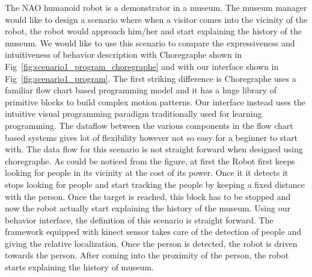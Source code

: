 \documentclass{llncs}
\begin{document}
The NAO humanoid robot is a demonstrator in a museum. The museum manager would like to design a scenario where when a visitor comes into the vicinity of the robot, the robot would approach him/her and start explaining the history of the museum. We would like to use this scenario to compare the expressiveness and intuitiveness of behavior description with Choregraphe \cite{Choregraphe} shown in Fig~\ref{fig:scenario1_program_choregraphe} and with our interface shown in Fig~\ref{fig:scenario1_program}. The first striking difference is Choregraphe uses a familiar flow chart based programming model and it has a huge library of primitive blocks to build complex motion patterns. Our interface instead uses the intuitive visual programming paradigm traditionally used for learning programming. The dataflow between the various components in the flow chart based systems gives lot of flexibility however not so easy for a beginner to start with. 
	The data flow for this scenario is not straight forward when designed using choregraphe. As could be noticed from the figure, at first the Robot first keeps looking for people in its vicinity at the cost of its power. Once it it detects it stops looking for people and start tracking the people by keeping a fixed distance with the person. Once the target is reached, this block has to be stopped and now the robot actually start explaining the history of the museum.
	Using our behavior interface, the definition of this scenario is straight forward. The framework equipped with kinect sensor takes care of the detection of people and giving the relative localization. Once the person is detected, the robot is driven towards the person. After coming into the proximity of the person, the robot starts explaining the history of museum.
%                                          
\end{document}
